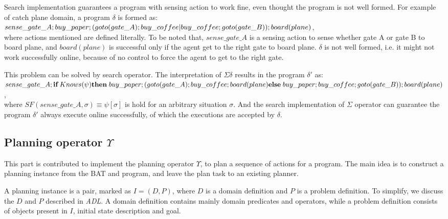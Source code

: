\documentclass[letterpaper]{article}
\begin{document}
Search implementation guarantees a program with sensing action to work fine, even thought the program is not well formed.
For example of catch plane domain, a program $\delta$ is formed as:
\\
$sense\_gate\_A;buy\_paper;\\
(goto(gate\_A);buy\_coffee|buy\_coffee;goto(gate\_B));\\
board(plane)$,\\
where actions mentioned are defined literally. To be noted that, $sense\_gate\_A$ is a sensing action to sense whether gate A or gate B to board plane, and $board(plane)$ is successful only if the agent get to the right gate to board plane. $\delta$ is not well formed, i.e. it might not work successfully online, because of no control to force the agent to get to the right gate.

This problem can be solved by search operator. The interpretation of $\Sigma\delta$ results in the program $\delta'$ as:
\\
$sense\_gate\_A;\\
\textbf{if}\; Knows(\psi)\\
\textbf{then}\; buy\_paper;(goto(gate\_A);buy\_coffee;board(plane)\\
\textbf{else}\; buy\_paper;buy\_coffee;goto(gate\_B));board(plane)$,\\
where $SF(sense\_gate\_A,\sigma)\equiv\psi[\sigma]$ is hold for an arbitrary situation $\sigma$. And the search implementation of $\Sigma$ operator can guarantee the program $\delta'$ always execute online successfully, of which the executions are accepted by $\delta$.

\subsection{Planning operator $\Upsilon$}

This part is contributed to implement the planning operator $\Upsilon$, to plan a sequence of actions for a program. The main idea is to construct a planning instance from the BAT and program, and leave the plan task to an existing planner.

A planning instance is a pair, marked as $I=(D,P)$, where $D$ is a domain definition and $P$ is a problem definition. To simplify, we discuss the $D$ and $P$ described in \emph{ADL}. A domain definition contains mainly domain predicates and operators, while a problem definition consists of objects present in $I$, initial state description and goal.
\end{document}
